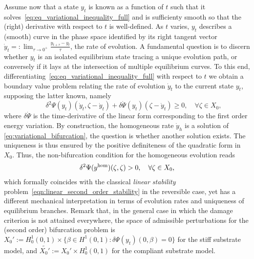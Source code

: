 \documentclass[10pt]{article}
\begin{document}
%


Assume now that a state $y_t$ is known as a function of $t$ such that it solves~\eqref{eq:eq_variational_inequality_full} and is sufficienty smooth so that the (right) derivative with respect to $t$ is well-defined. 
As $t$ varies, $y_t$ describes a (smooth) curve in the phase space identified by its right tangent vector $\dot y_t =: \lim_{\tau\to 0^+}\frac{y_{t+\tau} - y_t}{\tau}$, the rate of evolution.
A fundamental question is to discern whether $y_t$ is an isolated equilibrium state tracing a unique evolution path, or conversely if it lays at the intersection of multiple equilibrium curves.
%
%
%
To this end, differentiating~\eqref{eq:eq_variational_inequality_full} with respect to $t$ we  obtain a boundary value problem relating the rate of evolution $\dot y_t$ to the current state $y_t$, supposing the latter known, namely
%
\begin{equation}
    \label{eq:variational_bifurcation}
    \qquad \delta^2 \Psi(y_t)(\dot y_t,   \zeta -\dot y_t) + \delta \dot \Psi(y_t)(\zeta-\dot y_t) \geq 0, \quad \forall \zeta\in X_{0},
\end{equation}
%
where $\delta \dot \Psi$ is the time-derivative of the linear form corresponding to the first order energy variation.
By construction, the homogeneous rate $\dot y_h$ is a solution of \eqref{eq:variational_bifurcation}, the question is whether another solution exists. The uniqueness is thus ensured by the positive definiteness of the quadratic form 
%
in $X_0$. 
Thus, the non-bifurcation condition for the homogeneous evolution reads
%
%
\begin{equation}
    \label{eq:bifurcation_uniqueness}
    \delta^2 \Psi(y^{\text{hom}})(\zeta, \zeta) > 0, \quad \forall \zeta \in X_0,
\end{equation}
which formally coincides with the classical \emph{linear stability} problem~\eqref{eqn:linear_second_order_stability} in the reversible case, yet has a different mechanical interpretation in terms of evolution rates and uniqueness of equilibrium branches.
Remark that, in the general case in which the damage criterion is not attained everywhere, the space of admissible perturbations for the (second order) bifurcation problem is $X_0':=H^1_0(0, 1) \times \{ \beta \in H^1(0, 1) : \delta\Psi(y_t)(0, \beta) = 0 \}$ for the stiff substrate model, and $\widetilde{X_0'}:=X_0'\times H^1_0(0,1)$ for the compliant substrate model. 
\end{document}
